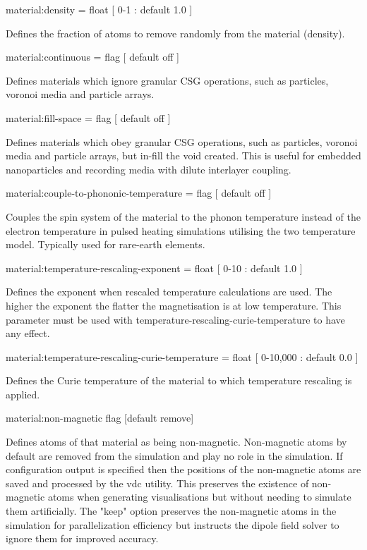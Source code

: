 {\zicf material:density = float [ 0-1 : default 1.0 ]} Defines the fraction of atoms to remove randomly from the material (density).

{\zicf material:continuous = flag [ default off ]} Defines materials which ignore granular CSG operations, such as particles, voronoi media and particle arrays.

{\zicf material:fill-space = flag [ default off ]} Defines materials which obey granular CSG operations, such as particles, voronoi media and particle arrays, but in-fill the void created. This is useful for embedded nanoparticles and recording media with dilute interlayer coupling.

{\zicf material:couple-to-phononic-temperature = flag [ default off ]} Couples the spin system of the material to the phonon temperature instead of the electron temperature in pulsed heating simulations utilising the two temperature model. Typically used for rare-earth elements.

{\zicf material:temperature-rescaling-exponent = float [ 0-10 : default 1.0 ]} Defines the exponent when rescaled temperature calculations are used. The higher the exponent the flatter the magnetisation is at low temperature. This parameter must be used with temperature-rescaling-curie-temperature to have any effect.

{\zicf material:temperature-rescaling-curie-temperature = float [ 0-10,000 : default 0.0 ]} Defines the Curie temperature of the material to which temperature rescaling is applied.

{\zicf material:non-magnetic flag [default remove]} Defines atoms of
that material as being non-magnetic. Non-magnetic atoms by default are removed from the simulation and play no role in the simulation. If configuration output is specified then the positions of the non-magnetic atoms are saved and processed by the vdc utility. This preserves the existence of non-magnetic atoms when generating visualisations but without needing to simulate them artificially. The "keep" option preserves the non-magnetic atoms in the simulation for parallelization efficiency but instructs the dipole field solver to ignore them for improved accuracy.

